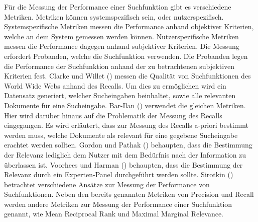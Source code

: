 
Für die Messung der Performance einer Suchfunktion gibt es verschiedene Metriken.
Metriken können systemspezifisch sein, oder nutzerspezifisch.
Systemspezifische Metriken messen die Performance anhand objektiver Kriterien, welche an dem System gemessen werden können.
Nutzerspezifische Metriken messen die Performance dagegen anhand subjektiver Kriterien.
Die Messung erfordert Probanden, welche die Suchfunktion verwenden.
Die Probanden legen die Performance der Suchfunktion anhand der zu betrachtenen subjektiven Kriterien fest.
Clarke und Willet (\citeyear{Clarke_Willett_1997}) messen die Qualität von Suchfunktionen des World Wide Webs anhand des Recalls.
Um dies zu ermöglichen wird ein Datensatz generiert, welcher Sucheingaben beinhaltet, sowie alle relevanten Dokumente für eine Sucheingabe.
Bar-Ilan (\citeyear{Bar-Ilan_2002}) verwendet die gleichen Metriken.
Hier wird darüber hinaus auf die Problematik der Messung des Recalls eingegangen.
Es wird erläutert, dass zur Messung des Recalls a-priori bestimmt werden muss, welche Dokumente als relevant für eine gegebene Sucheingabe erachtet werden sollten.
Gordon und Pathak (\citeyear{Gordon_Pathak_1999}) behaupten, dass die Bestimmung der Relevanz lediglich dem Nutzer mit dem Bedürfnis nach der Information zu überlassen ist.
Voorhees und Harman (\citeyear{Voorhees_Harman_2001}) behaupten, dass die Bestimmung der Relevanz durch ein Experten-Panel durchgeführt werden sollte.
Sirotkin (\citeyear{Sirotkin_2012}) betrachtet verschiedene Ansätze zur Messung der Performance von Suchfunktionen.
Neben den bereits genannten Metriken von Precision und Recall werden andere Metriken zur Messung der Performance einer Suchfunktion genannt, wie Mean Reciprocal Rank und Maximal Marginal Relevance.\\
